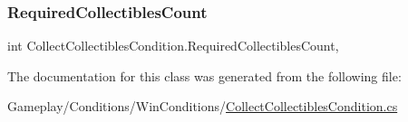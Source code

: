 \subsubsection{\texorpdfstring{Required\+Collectibles\+Count}{RequiredCollectiblesCount}}
{\footnotesize\ttfamily int Collect\+Collectibles\+Condition.\+Required\+Collectibles\+Count\hspace{0.3cm}{\ttfamily [get]}, {\ttfamily [set]}}



The documentation for this class was generated from the following file\+:\begin{DoxyCompactItemize}
\item 
Gameplay/\+Conditions/\+Win\+Conditions/\mbox{\hyperlink{_collect_collectibles_condition_8cs}{Collect\+Collectibles\+Condition.\+cs}}\end{DoxyCompactItemize}
